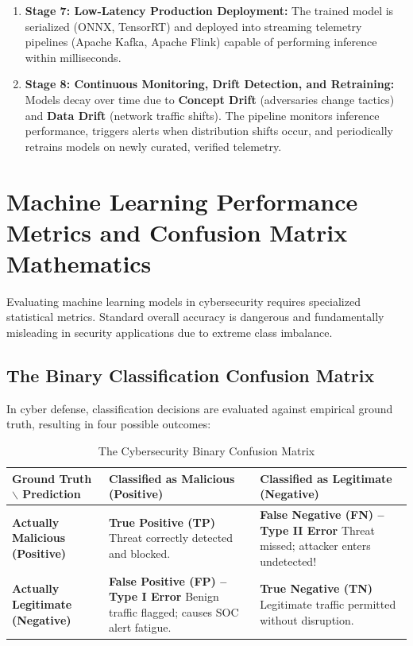 \begin{enumerate}
The model is validated against out-of-time test sets and adversarial sample benchmarks. Evaluation metrics beyond simple accuracy (Precision, Recall, F1-Score, ROC-AUC) are computed.
\item \textbf{Stage 7: Low-Latency Production Deployment:}
The trained model is serialized (ONNX, TensorRT) and deployed into streaming telemetry pipelines (Apache Kafka, Apache Flink) capable of performing inference within milliseconds.
\item \textbf{Stage 8: Continuous Monitoring, Drift Detection, and Retraining:}
Models decay over time due to \textbf{Concept Drift} (adversaries change tactics) and \textbf{Data Drift} (network traffic shifts). The pipeline monitors inference performance, triggers alerts when distribution shifts occur, and periodically retrains models on newly curated, verified telemetry.
\end{enumerate}

\newpage
\section{Machine Learning Performance Metrics and Confusion Matrix Mathematics}

Evaluating machine learning models in cybersecurity requires specialized statistical metrics. Standard overall accuracy is dangerous and fundamentally misleading in security applications due to extreme class imbalance.

\subsection{The Binary Classification Confusion Matrix}

In cyber defense, classification decisions are evaluated against empirical ground truth, resulting in four possible outcomes:

\begin{table}[htbp]
\centering
\caption{The Cybersecurity Binary Confusion Matrix}
\label{tab:confusion_matrix}
\begin{tabularx}{\textwidth}{l X X}
\toprule
\textbf{Ground Truth $\backslash$ Prediction} & \textbf{Classified as Malicious (Positive)} & \textbf{Classified as Legitimate (Negative)} \\
\midrule
\textbf{Actually Malicious (Positive)} & \textbf{True Positive (TP)} \newline Threat correctly detected and blocked. & \textbf{False Negative (FN) -- Type II Error} \newline Threat missed; attacker enters undetected! \\
\midrule
\textbf{Actually Legitimate (Negative)} & \textbf{False Positive (FP) -- Type I Error} \newline Benign traffic flagged; causes SOC alert fatigue. & \textbf{True Negative (TN)} \newline Legitimate traffic permitted without disruption. \\
\bottomrule
\end{tabularx}
\end{table}

